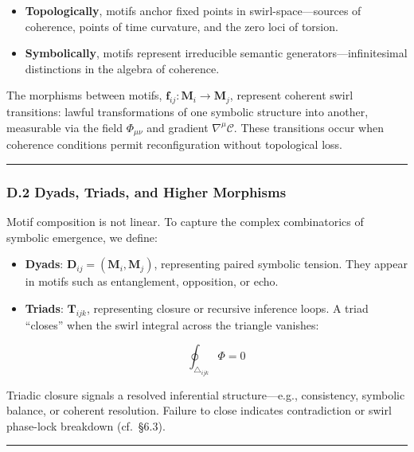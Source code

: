 \documentclass[
  11pt,
]{article}
\providecommand{\tightlist}{%
  \setlength{\itemsep}{0pt}\setlength{\parskip}{0pt}}
\begin{document}
\begin{itemize}
\tightlist
\item
  \textbf{Topologically}, motifs anchor fixed points in
  swirl-space---sources of coherence, points of time curvature, and the
  zero loci of torsion.
\item
  \textbf{Symbolically}, motifs represent irreducible semantic
  generators---infinitesimal distinctions in the algebra of coherence.
\end{itemize}

The morphisms between motifs,
\(\mathbf{f}_{ij}: \mathbf{M}_i \rightarrow \mathbf{M}_j\), represent
coherent swirl transitions: lawful transformations of one symbolic
structure into another, measurable via the field \(\Phi_{\mu\nu}\) and
gradient \(\nabla^\mu \mathcal{C}\). These transitions occur when
coherence conditions permit reconfiguration without topological loss.

\begin{center}\rule{0.5\linewidth}{0.5pt}\end{center}

\subsubsection{\texorpdfstring{\textbf{D.2 Dyads, Triads, and Higher
Morphisms}}{D.2 Dyads, Triads, and Higher Morphisms}}\label{d.2-dyads-triads-and-higher-morphisms}

Motif composition is not linear. To capture the complex combinatorics of
symbolic emergence, we define:

\begin{itemize}
\item
  \textbf{Dyads}: \(\mathbf{D}_{ij} = (\mathbf{M}_i, \mathbf{M}_j)\),
  representing paired symbolic tension. They appear in motifs such as
  entanglement, opposition, or echo.
\item
  \textbf{Triads}: \(\mathbf{T}_{ijk}\), representing closure or
  recursive inference loops. A triad ``closes'' when the swirl integral
  across the triangle vanishes:

  \[
  \oint_{\triangle_{ijk}} \Phi = 0
  \]
\end{itemize}

Triadic closure signals a resolved inferential structure---e.g.,
consistency, symbolic balance, or coherent resolution. Failure to close
indicates contradiction or swirl phase-lock breakdown (cf.~§6.3).

\begin{center}\rule{0.5\linewidth}{0.5pt}\end{center}
\end{document}
